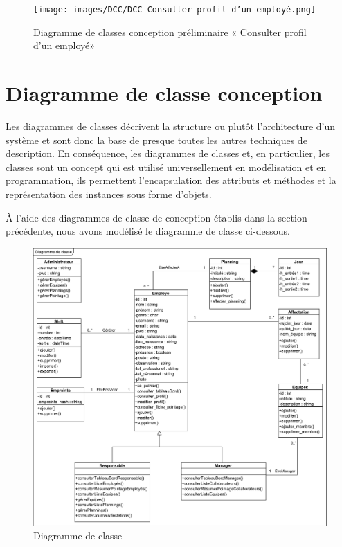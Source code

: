 \begin{figure}[h!]
    \centering
    \texttt{[image: images/DCC/DCC Consulter profil d'un employé.png]}
    \caption{Diagramme de classes conception préliminaire « Consulter profil d'un employé»}
    \label{fig46}
\end{figure}

\section{Diagramme de classe conception}
Les diagrammes de classes décrivent la structure ou plutôt l’architecture d’un 
système et sont donc la base de presque toutes les autres techniques de 
description. En conséquence, les diagrammes de classes et, en particulier, les 
classes sont un concept qui est utilisé universellement en modélisation et en 
programmation, ils permettent l’encapsulation des attributs et méthodes et la 
représentation des instances sous forme d’objets\cite{10}.

À l’aide des diagrammes de classe de conception établis dans la section 
précédente, nous avons modélisé le diagramme de classe ci-dessous.

\begin{figure}[h!]
    \centering
    \includegraphics[scale=0.69]{images/DCC/Diagramme de classe.png}
    \caption{Diagramme de classe}
    \label{fig47}
\end{figure}

